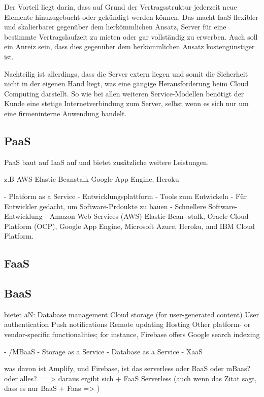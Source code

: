 Der Vorteil liegt darin, dass auf Grund der Vertragsstruktur jederzeit neue Elemente hinuzugebucht oder gekündigt werden können. Das macht \acl{IaaS} flexibler und skalierbarer gegenüber dem herkömmlichen Ansatz, Server für eine bestimmte Vertragslaufzeit zu mieten oder gar vollständig zu erwerben. Auch soll ein Anreiz sein, dass dies gegenüber dem herkömmlichen Ansatz kostengünstiger ist.

Nachteilig ist allerdings, dass die Server extern liegen und somit die Sicherheit nicht in der eigenen Hand liegt, was eine gängige Herausforderung beim Cloud Computing darstellt. So wie bei allen weiteren Service-Modellen benötigt der Kunde eine stetige Internetverbindung zum Server, selbst wenn es sich nur um eine firmeninterne Anwendung handelt.

\subsection{\acl{PaaS}}

\acf{PaaS} baut auf \acl{IaaS} auf und bietet zusätzliche weitere Leistungen.

z.B AWS Elastic Beanstalk
Google App Engine, Heroku

- Platform as a Service
    - Entwicklungsplattform
    - Tools zum Entwickeln
    - Für Entwickler gedacht, um Software-Prdoukte zu bauen
    - Schnellere Software-Entwicklung
        - Amazon Web Services (AWS) Elastic Bean- stalk, Oracle Cloud Platform (OCP), Google App Engine, Microsoft Azure, Heroku, and IBM Cloud Platform.

\subsection{\acl{FaaS}}

\subsection{\acl{BaaS}}

bietet aN:
  Database management
  Cloud storage (for user-generated content)
  User authentication
  Push notifications
  Remote updating
  Hosting
  Other platform- or vendor-specific functionalities; for instance, Firebase offers Google search indexing

- /MBaaS
- Storage as a Service
- Database as a Service
- XaaS

was davon ist Amplify, und Firebase, ist das serverless oder BaaS oder mBaas? oder alles?
==> daraus ergibt sich + FaaS Serverless (auch wenn das Zitat sagt, dass es nur BaaS + Faas => )

